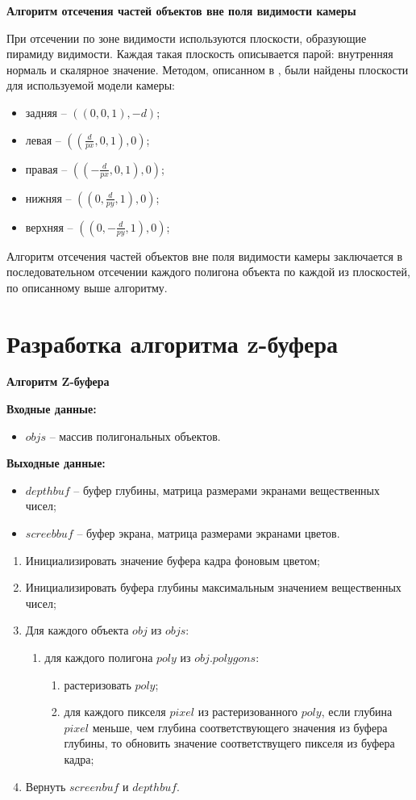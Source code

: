 \textbf{Алгоритм отсечения частей объектов вне поля видимости камеры}

При отсечении по зоне видимости используются плоскости, образующие пирамиду видимости. Каждая такая плоскость описывается парой: внутренняя нормаль и скалярное значение. Методом, описанном в \cite{gabriella}, были найдены плоскости для используемой модели камеры:
	
\begin{itemize}
	\item задняя -- $((0, 0, 1), -d)$;
	\item левая -- $((\frac{d}{px}, 0, 1), 0)$;
	\item правая -- $((-\frac{d}{px}, 0, 1), 0)$;
	\item нижняя -- $((0, \frac{d}{py}, 1), 0)$;
	\item верхняя -- $((0, -\frac{d}{py}, 1), 0)$;
\end{itemize}

Алгоритм отсечения частей объектов вне поля видимости камеры заключается в последовательном отсечении каждого полигона объекта по каждой из плоскостей, по описанному выше алгоритму.


\section{Разработка алгоритма z-буфера}

\textbf{Алгоритм Z-буфера}

\textbf{Входные данные:}
\begin{itemize}
	\item $objs$ -- массив полигональных объектов.
\end{itemize}

\textbf{Выходные данные:}
\begin{itemize}
	\item $depthbuf$ -- буфер глубины, матрица размерами экранами вещественных чисел;
	\item $screebbuf$ -- буфер экрана, матрица размерами экранами цветов.
\end{itemize}

\begin{enumerate}
	\item Инициализировать значение буфера кадра фоновым цветом;
	\item  Инициализировать буфера глубины максимальным значением вещественных чисел;
	\item Для каждого объекта $obj$ из $objs$:
	\begin{enumerate}
		\item для каждого полигона $poly$ из $obj.polygons$:
		\begin{enumerate}
			\item растеризовать $poly$;
			\item для каждого пикселя $pixel$ из растеризованного $poly$, если глубина $pixel$ меньше, чем глубина соответствующего значения из буфера глубины, то обновить значение соответствущего пикселя из буфера кадра;
		\end{enumerate}
	\end{enumerate}
	\item Вернуть $screenbuf$ и $depthbuf$.
\end{enumerate}

